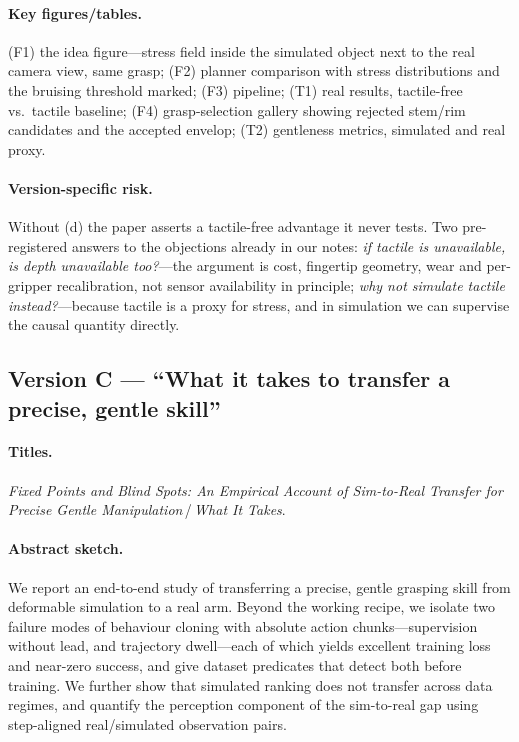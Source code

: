 \paragraph{Key figures/tables.}
(F1) the idea figure---stress field inside the simulated object next to the real camera view,
same grasp; (F2) planner comparison with stress distributions and the bruising threshold
marked; (F3) pipeline; (T1) real results, tactile-free vs.\ tactile baseline; (F4)
grasp-selection gallery showing rejected stem/rim candidates and the accepted envelop; (T2)
gentleness metrics, simulated and real proxy.

\paragraph{Version-specific risk.} Without (d) the paper asserts a tactile-free advantage it
never tests. Two pre-registered answers to the objections already in our notes: \emph{if
tactile is unavailable, is depth unavailable too?}---the argument is cost, fingertip geometry,
wear and per-gripper recalibration, not sensor availability in principle; \emph{why not
simulate tactile instead?}---because tactile is a proxy for stress, and in simulation we can
supervise the causal quantity directly.

\subsection{Version C --- ``What it takes to transfer a precise, gentle skill''}
\label{sec:outlines:C}

\paragraph{Titles.}
\emph{Fixed Points and Blind Spots: An Empirical Account of Sim-to-Real Transfer for Precise
Gentle Manipulation}\,/\,\emph{What It Takes}.

\paragraph{Abstract sketch.}
We report an end-to-end study of transferring a precise, gentle grasping skill from
deformable simulation to a real arm. Beyond the working recipe, we isolate two failure modes
of behaviour cloning with absolute action chunks---supervision without lead, and trajectory
dwell---each of which yields excellent training loss and near-zero success, and give dataset
predicates that detect both before training. We further show that simulated ranking does not
transfer across data regimes, and quantify the perception component of the sim-to-real gap
using step-aligned real/simulated observation pairs.

